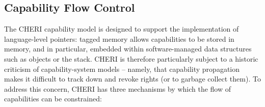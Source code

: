 \subsection{Capability Flow Control}
\label{sec:model-capability-control-flow}

The CHERI capability model is designed to support the implementation of
language-level pointers: tagged memory allows capabilities to be stored in
memory, and in particular, embedded within software-managed data structures
such as objects or the stack.
CHERI is therefore particularly subject to a historic criticism of
capability-system models -- namely,
that capability propagation makes it difficult to track
down and revoke rights (or to garbage collect them).
To address this concern, CHERI has three mechanisms by which the flow of
capabilities can be constrained:

